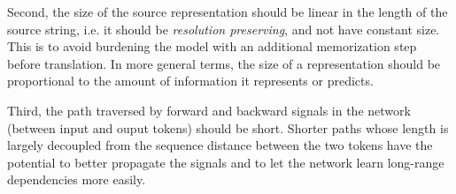 \documentclass{article}
\begin{document}
Second, the size of the source representation should be linear in the length of the source string, i.e. it should be \emph{resolution preserving}, and not have constant size. This is to avoid burdening the model with an additional memorization step before translation. In more general terms, the size of a representation should be proportional to the amount of information it represents or predicts. 

Third, the path traversed by forward and backward signals in the network (between input and ouput tokens) should be short.
Shorter paths whose length is largely decoupled from the sequence distance between the two tokens have the potential to better propagate the signals \citep{chapter-gradient-flow-2001} and to let the network learn long-range dependencies more easily. 
\end{document}
